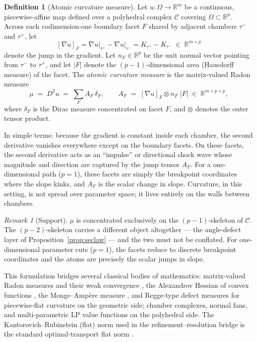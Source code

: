 \documentclass[11pt,a4paper]{article}
\theoremstyle{plain}
\theoremstyle{definition}
\newtheorem{definition}[theorem]{Definition}
\theoremstyle{remark}
\newtheorem{remark}[theorem]{Remark}
\newcommand{\CC}{\mathcal{C}}
\newcommand{\RR}{\mathbb{R}}
\begin{document}
\begin{definition}[Atomic curvature measure]\label{def:mu}
Let $u : \Omega \to \RR^m$ be a continuous, piecewise-affine map
defined over a polyhedral complex $\CC$ covering $\Omega \subset
\RR^p$. Across each codimension-one boundary facet $F$ shared by
adjacent chambers $\tau^-$ and $\tau^+$, let
\[
[\nabla u]_F
= \left.\nabla u\right|_{\tau^+} - \left.\nabla u\right|_{\tau^-}
= K_{\tau^+} - K_{\tau^-}
\;\in\; \RR^{m \times p}
\]
denote the jump in the gradient. Let $n_F \in \RR^p$ be the unit
normal vector pointing from $\tau^-$ to $\tau^+$, and let $|F|$ denote
the $(p-1)$-dimensional area (Hausdorff measure) of the facet. The
\emph{atomic curvature measure} is the matrix-valued Radon measure
\[
\mu \;=\; D^2 u \;=\; \sum_{F} A_F \, \delta_F,
\qquad
A_F \;=\; [\nabla u]_F \otimes n_F \; |F| \;\in\; \RR^{m \times p \times p},
\]
where $\delta_F$ is the Dirac measure concentrated on facet $F$, and
$\otimes$ denotes the outer tensor product.
\end{definition}

In simple terms: because the gradient is constant inside each
chamber, the second derivative vanishes everywhere except on the
boundary facets. On these facets, the second derivative acts as an
``impulse'' or directional shock wave whose magnitude and direction
are captured by the jump tensor $A_F$. For a one-dimensional path
($p=1$), these facets are simply the breakpoint coordinates where the
slope kinks, and $A_F$ is the scalar change in slope. Curvature, in
this setting, is not spread over parameter space; it lives entirely on
the walls between chambers.

\begin{remark}[Support]\label{rem:support}
$\mu$ is concentrated exclusively on the $(p-1)$-skeleton of $\CC$.
The $(p-2)$-skeleton carries a different object altogether --- the
angle-defect layer of Proposition~\ref{prop:seclaw} --- and the two
must not be conflated. For one-dimensional parameter cuts ($p=1$),
the facets reduce to discrete breakpoint coordinates and the atoms
are precisely the scalar jumps in slope.
\end{remark}

This formulation bridges several classical bodies of mathematics:
matrix-valued Radon measures and their weak convergence
\citep{billingsley1999}, the Alexandrov Hessian of convex functions
\citep{alexandrov1939}, the Monge--Amp\`ere measure \citep{gutierrez2001},
and Regge-type defect measures for piecewise-flat curvature
\citep{regge1961, cheeger1984} on the geometric side; chamber
complexes, normal fans, and multi-parametric LP value functions
\citep{rockafellar1970, ziegler1995, borrelli2003} on the polyhedral
side. The Kantorovich--Rubinstein (flat) norm used in the
refinement--resolution bridge is the standard optimal-transport flat
norm \citep{villani2009}.
\end{document}
